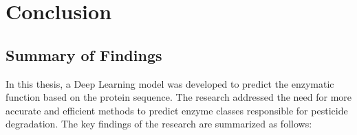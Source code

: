 \section{Conclusion}

\subsection{Summary of Findings}
\label{sec:Summary of Findings}

In this thesis, a Deep Learning model was developed to predict the enzymatic function based on the protein sequence. The research addressed the need for more accurate and efficient methods to predict enzyme classes responsible for pesticide degradation. The key findings of the research are summarized as follows:

